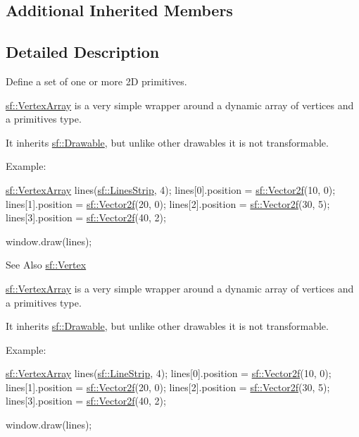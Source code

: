 \subsection*{Additional Inherited Members}


\subsection{Detailed Description}
Define a set of one or more 2\-D primitives. 

\hyperlink{classsf_1_1_vertex_array}{sf\-::\-Vertex\-Array} is a very simple wrapper around a dynamic array of vertices and a primitives type.

It inherits \hyperlink{classsf_1_1_drawable}{sf\-::\-Drawable}, but unlike other drawables it is not transformable.

Example\-: 
\begin{DoxyCode}
\hyperlink{classsf_1_1_vertex_array}{sf::VertexArray} lines(\hyperlink{group__graphics_gga5ee56ac1339984909610713096283b1bafc070260a0222df367922706bbeb905a}{sf::LinesStrip}, 4);
lines[0].position = \hyperlink{namespacesf_a80cea3c46537294fd1d8d428566ad8b2}{sf::Vector2f}(10, 0);
lines[1].position = \hyperlink{namespacesf_a80cea3c46537294fd1d8d428566ad8b2}{sf::Vector2f}(20, 0);
lines[2].position = \hyperlink{namespacesf_a80cea3c46537294fd1d8d428566ad8b2}{sf::Vector2f}(30, 5);
lines[3].position = \hyperlink{namespacesf_a80cea3c46537294fd1d8d428566ad8b2}{sf::Vector2f}(40, 2);

window.draw(lines);
\end{DoxyCode}


\begin{DoxySeeAlso}{See Also}
\hyperlink{classsf_1_1_vertex}{sf\-::\-Vertex}
\end{DoxySeeAlso}
\hyperlink{classsf_1_1_vertex_array}{sf\-::\-Vertex\-Array} is a very simple wrapper around a dynamic array of vertices and a primitives type.

It inherits \hyperlink{classsf_1_1_drawable}{sf\-::\-Drawable}, but unlike other drawables it is not transformable.

Example\-: 
\begin{DoxyCode}
\hyperlink{classsf_1_1_vertex_array}{sf::VertexArray} lines(\hyperlink{group__graphics_gga5ee56ac1339984909610713096283b1ba14d9eeec2c7c314f239a57bde35949fa}{sf::LineStrip}, 4);
lines[0].position = \hyperlink{namespacesf_a80cea3c46537294fd1d8d428566ad8b2}{sf::Vector2f}(10, 0);
lines[1].position = \hyperlink{namespacesf_a80cea3c46537294fd1d8d428566ad8b2}{sf::Vector2f}(20, 0);
lines[2].position = \hyperlink{namespacesf_a80cea3c46537294fd1d8d428566ad8b2}{sf::Vector2f}(30, 5);
lines[3].position = \hyperlink{namespacesf_a80cea3c46537294fd1d8d428566ad8b2}{sf::Vector2f}(40, 2);

window.draw(lines);
\end{DoxyCode}


